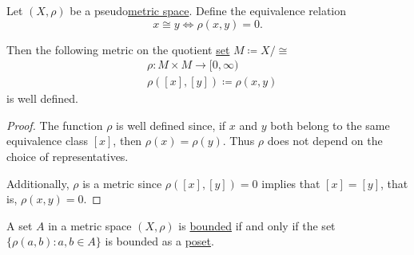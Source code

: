 \begin{Proposition}\label{thm:pseudometric_to_metric}
  Let \( (X, \rho) \) be a pseudo\hyperref[def:metric_space]{metric space}. Define the equivalence relation
  \begin{equation*}
    x \cong y \iff \rho(x, y) = 0.
  \end{equation*}

  Then the following metric on the quotient \hyperref[thm:equivalence_partition]{set} \( M \coloneqq X / \cong \)
  \begin{align*}
    &\rho: M \times M \to [0, \infty) \\
    &\rho([x], [y]) \coloneqq \rho(x, y)
  \end{align*}
  is well defined.
\end{Proposition}
\begin{proof}
  The function \( \rho \) is well defined since, if \( x \) and \( y \) both belong to the same equivalence class \( [x] \), then \( \rho(x) = \rho(y) \). Thus \( \rho \) does not depend on the choice of representatives.

  Additionally, \( \rho \) is a metric since \( \rho([x], [y]) = 0 \) implies that \( [x] = [y] \), that is, \( \rho(x, y) = 0 \).
\end{proof}

\begin{Proposition}\label{remark:bounded_set_metric_order_equivalence}
  A set \( A \) in a metric space \( (X, \rho) \) is \hyperref[def:metric_space/bounded_set]{bounded} if and only if the set \( \{ \rho(a, b) \colon a, b \in A \} \) is bounded as a \hyperref[def:preordered_set/bounded_set]{poset}.
\end{Proposition}


